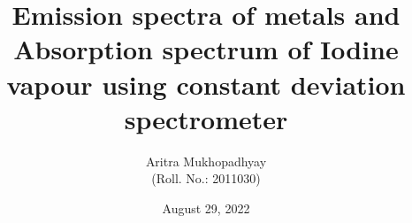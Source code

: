 \documentclass[10pt]{article}
\title{\textbf{Emission spectra of metals and Absorption spectrum of Iodine vapour using constant deviation spectrometer}}
\author{Aritra Mukhopadhyay\\(Roll. No.: 2011030)}
\date{August 29, 2022}
\begin{document}
    \maketitle
    
    \begin{multicols*}{2}
        
        
        
        
        
        
        

        
        
        \nocite{*}
    \end{multicols*}
\end{document}
